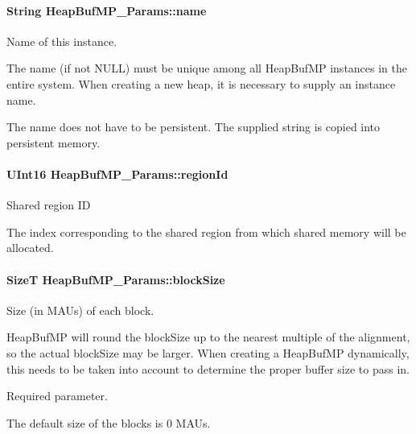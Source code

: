 \paragraph[{name}]{\setlength{\rightskip}{0pt plus 5cm}String Heap\-Buf\-M\-P\-\_\-\-Params\-::name}\label{struct_heap_buf_m_p___params_aaefdf87660dc3b0a57d33f10791dcc02}
Name of this instance. \begin{DoxyVerb}   The name (if not NULL) must be unique among all HeapBufMP
   instances in the entire system.  When creating a new
   heap, it is necessary to supply an instance name.

   The name does not have to be persistent.  The supplied string is copied
   into persistent memory.\end{DoxyVerb}
\paragraph[{region\-Id}]{\setlength{\rightskip}{0pt plus 5cm}U\-Int16 Heap\-Buf\-M\-P\-\_\-\-Params\-::region\-Id}\label{struct_heap_buf_m_p___params_a22f33c326f94898613b8d40335be4eee}
Shared region I\-D \begin{DoxyVerb}   The index corresponding to the shared region from which shared memory
   will be allocated.\end{DoxyVerb}
\paragraph[{block\-Size}]{\setlength{\rightskip}{0pt plus 5cm}Size\-T Heap\-Buf\-M\-P\-\_\-\-Params\-::block\-Size}\label{struct_heap_buf_m_p___params_afc5038de12c1e9bf75d642c1081b74ac}
Size (in M\-A\-Us) of each block.

Heap\-Buf\-M\-P will round the block\-Size up to the nearest multiple of the alignment, so the actual block\-Size may be larger. When creating a Heap\-Buf\-M\-P dynamically, this needs to be taken into account to determine the proper buffer size to pass in.

Required parameter.

The default size of the blocks is 0 M\-A\-Us. 
